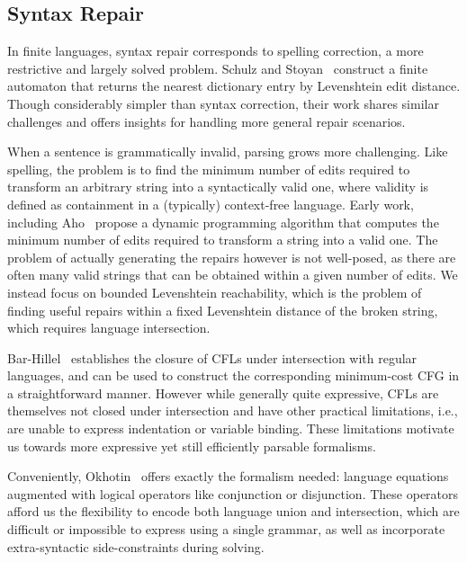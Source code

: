 \documentclass[sigplan,review,anonymous,acmsmall]{acmart}\settopmatter{printfolios=false,printccs=false,printacmref=false}
\begin{document}
\subsection{Syntax Repair}

In finite languages, syntax repair corresponds to spelling correction, a more restrictive and largely solved problem. Schulz and Stoyan~\cite{schulz2002fast} construct a finite automaton that returns the nearest dictionary entry by Levenshtein edit distance. Though considerably simpler than syntax correction, their work shares similar challenges and offers insights for handling more general repair scenarios.

When a sentence is grammatically invalid, parsing grows more challenging. Like spelling, the problem is to find the minimum number of edits required to transform an arbitrary string into a syntactically valid one, where validity is defined as containment in a (typically) context-free language. Early work, including Aho~\cite{irons1963error, aho1972minimum} propose a dynamic programming algorithm that computes the minimum number of edits required to transform a string into a valid one. The problem of actually generating the repairs however is not well-posed, as there are often many valid strings that can be obtained within a given number of edits. We instead focus on bounded Levenshtein reachability, which is the problem of finding useful repairs within a fixed Levenshtein distance of the broken string, which requires language intersection.

Bar-Hillel~\cite{bar1961formal} establishes the closure of CFLs under intersection with regular languages, and can be used to construct the corresponding minimum-cost CFG in a straightforward manner. However while generally quite expressive, CFLs are themselves not closed under intersection and have other practical limitations, i.e., are unable to express indentation or variable binding. These limitations motivate us towards more expressive yet still efficiently parsable formalisms.

Conveniently, Okhotin~\cite{okhotin2010decision} offers exactly the formalism needed: language equations augmented with logical operators like conjunction or disjunction. These operators afford us the flexibility to encode both language union and intersection, which are difficult or impossible to express using a single grammar, as well as incorporate extra-syntactic side-constraints during solving.

\end{document}
